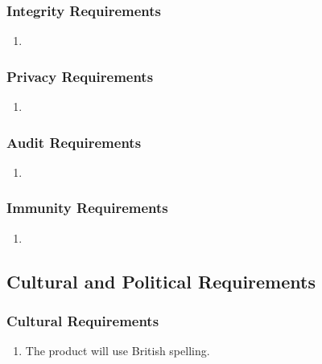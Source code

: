 \documentclass[english]{article}
\begin{document}
\subsubsection{Integrity Requirements}
\label{ssub:integrity_requirements}
\begin{enumerate}[{SR}1. ]
	\item 
\end{enumerate}

\subsubsection{Privacy Requirements}
\label{ssub:privacy_requirements}
\begin{enumerate}[{SR}1. ]
	\item 
\end{enumerate}

\subsubsection{Audit Requirements}
\label{ssub:audit_requirements}
\begin{enumerate}[{SR}1. ]
	\item 
\end{enumerate}

\subsubsection{Immunity Requirements}
\label{ssub:immunity_requirements}
\begin{enumerate}[{SR}1. ]
	\item 
\end{enumerate}


\subsection{Cultural and Political Requirements}
\label{sub:cultural_and_political_requirements}

\subsubsection{Cultural Requirements}
\label{ssub:cultural_requirements}
\begin{enumerate}[{CP}1. ]
	\item The product will use British spelling.
\end{enumerate}
\end{document}
